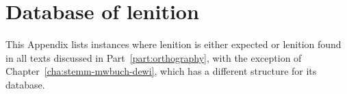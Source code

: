 \chapter{Database of lenition}
\label{cha:database-lenition}
This Appendix lists instances where lenition is either expected or lenition found in all texts discussed in Part~\ref{part:orthography}, with the exception of Chapter~\ref{cha:stemm-mwbuch-dewi}, which has a different structure for its database.
